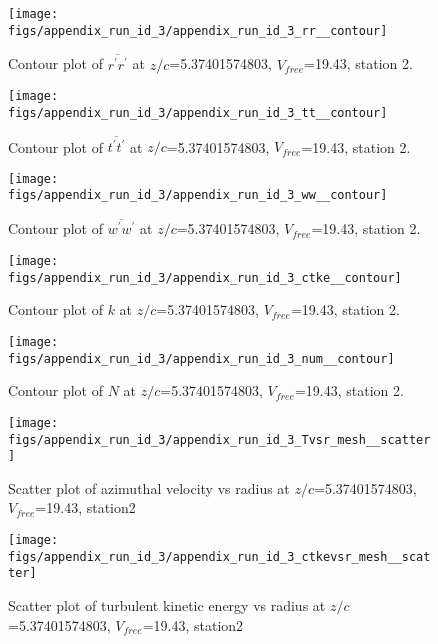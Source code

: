 \begin{figure}[H]
\centering
\texttt{[image: figs/appendix\_run\_id\_3/appendix\_run\_id\_3\_rr\_\_contour]}
\caption{Contour plot of $\overline{r^\prime r^\prime}$ at $z/c$=5.37401574803, $V_{free}$=19.43, station 2.}
\label{fig:appendix_run_id_3_rr__contour}
\end{figure}


\begin{figure}[H]
\centering
\texttt{[image: figs/appendix\_run\_id\_3/appendix\_run\_id\_3\_tt\_\_contour]}
\caption{Contour plot of $\overline{t^\prime t^\prime}$ at $z/c$=5.37401574803, $V_{free}$=19.43, station 2.}
\label{fig:appendix_run_id_3_tt__contour}
\end{figure}


\begin{figure}[H]
\centering
\texttt{[image: figs/appendix\_run\_id\_3/appendix\_run\_id\_3\_ww\_\_contour]}
\caption{Contour plot of $\overline{w^\prime w^\prime}$ at $z/c$=5.37401574803, $V_{free}$=19.43, station 2.}
\label{fig:appendix_run_id_3_ww__contour}
\end{figure}


\begin{figure}[H]
\centering
\texttt{[image: figs/appendix\_run\_id\_3/appendix\_run\_id\_3\_ctke\_\_contour]}
\caption{Contour plot of $k$ at $z/c$=5.37401574803, $V_{free}$=19.43, station 2.}
\label{fig:appendix_run_id_3_ctke__contour}
\end{figure}


\begin{figure}[H]
\centering
\texttt{[image: figs/appendix\_run\_id\_3/appendix\_run\_id\_3\_num\_\_contour]}
\caption{Contour plot of $N$ at $z/c$=5.37401574803, $V_{free}$=19.43, station 2.}
\label{fig:appendix_run_id_3_num__contour}
\end{figure}


\begin{figure}[H]
\centering
\texttt{[image: figs/appendix\_run\_id\_3/appendix\_run\_id\_3\_Tvsr\_mesh\_\_scatter]}
\caption{Scatter plot of azimuthal velocity vs radius at $z/c$=5.37401574803, $V_{free}$=19.43, station2}
\label{fig:appendix_run_id_3_Tvsr_mesh__scatter}
\end{figure}


\begin{figure}[H]
\centering
\texttt{[image: figs/appendix\_run\_id\_3/appendix\_run\_id\_3\_ctkevsr\_mesh\_\_scatter]}
\caption{Scatter plot of turbulent kinetic energy vs radius at $z/c$=5.37401574803, $V_{free}$=19.43, station2}
\label{fig:appendix_run_id_3_ctkevsr_mesh__scatter}
\end{figure}


